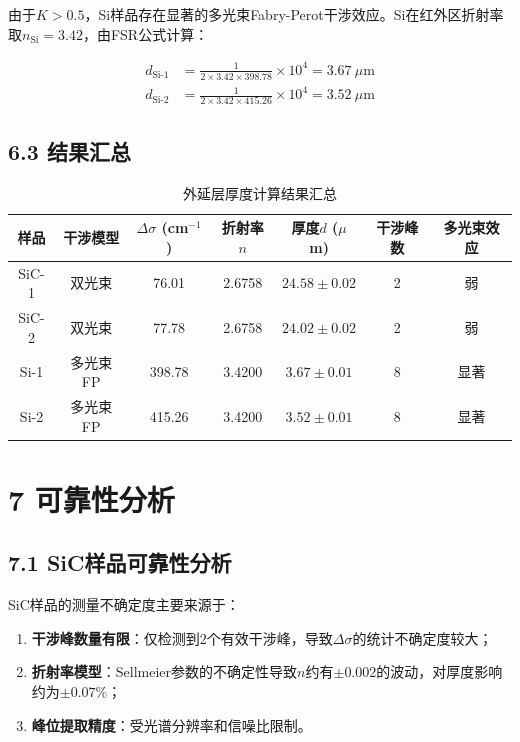 \documentclass[12pt,a4paper]{article}
\begin{document}
由于$K > 0.5$，Si样品存在显著的多光束Fabry-Perot干涉效应。Si在红外区折射率取$n_{\text{Si}} = 3.42$，由FSR公式计算：

\begin{align}
d_{\text{Si-1}} &= \frac{1}{2 \times 3.42 \times 398.78} \times 10^4 = 3.67\ \mu\text{m} \\
d_{\text{Si-2}} &= \frac{1}{2 \times 3.42 \times 415.26} \times 10^4 = 3.52\ \mu\text{m}
\end{align}

\subsection{6.3 结果汇总}

\begin{table}[H]
\centering
\begin{tabular}{ccccccc}
\toprule
样品 & 干涉模型 & $\Delta\sigma$ (cm$^{-1}$) & 折射率$n$ & 厚度$d$ ($\mu$m) & 干涉峰数 & 多光束效应 \\
\midrule
SiC-1 & 双光束 & 76.01 & 2.6758 & $\mathbf{24.58 \pm 0.02}$ & 2 & 弱 \\
SiC-2 & 双光束 & 77.78 & 2.6758 & $\mathbf{24.02 \pm 0.02}$ & 2 & 弱 \\
Si-1 & 多光束FP & 398.78 & 3.4200 & $\mathbf{3.67 \pm 0.01}$ & 8 & 显著 \\
Si-2 & 多光束FP & 415.26 & 3.4200 & $\mathbf{3.52 \pm 0.01}$ & 8 & 显著 \\
\bottomrule
\end{tabular}
\caption{外延层厚度计算结果汇总}
\end{table}

\section{7 可靠性分析}

\subsection{7.1 SiC样品可靠性分析}
SiC样品的测量不确定度主要来源于：
\begin{enumerate}
\item \textbf{干涉峰数量有限}：仅检测到2个有效干涉峰，导致$\Delta\sigma$的统计不确定度较大；
\item \textbf{折射率模型}：Sellmeier参数的不确定性导致$n$约有$\pm0.002$的波动，对厚度影响约为$\pm0.07\%$；
\item \textbf{峰位提取精度}：受光谱分辨率和信噪比限制。
\end{enumerate}
\end{document}

